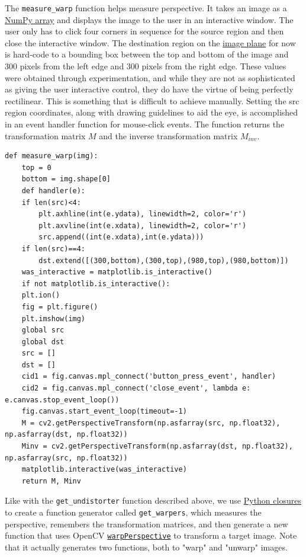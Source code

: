 \documentclass[11pt]{article}
\begin{document}
The \texttt{measure\_warp} function helps measure perspective.  It takes
an image as a \href{https://docs.scipy.org/doc/numpy/reference/generated/numpy.array.html}{NumPy array} and displays the image to the user in
an interactive window.  The user only has to click four corners
in sequence for the source region and then close the interactive
window.  The destination region on the \href{https://en.wikipedia.org/wiki/Image_plane}{image plane} for now is
hard-code to a bounding box between the top and bottom of the
image and 300 pixels from the left edge and 300 pixels from the
right edge.  These values were obtained through experimentation,
and while they are not as sophisticated as giving the user
interactive control, they do have the virtue of being perfectly
rectilinear.  This is something that is difficult to achieve
manually.  Setting the src region coordinates, along with
drawing guidelines to aid the eye, is accomplished in an
event handler function for mouse-click events.  The function
returns the transformation matrix $M$ and the inverse
transformation matrix $M_{inv}$.  

\begin{verbatim}
def measure_warp(img):
    top = 0
    bottom = img.shape[0]
    def handler(e):
	if len(src)<4:
	    plt.axhline(int(e.ydata), linewidth=2, color='r')
	    plt.axvline(int(e.xdata), linewidth=2, color='r')
	    src.append((int(e.xdata),int(e.ydata)))
	if len(src)==4:
	    dst.extend([(300,bottom),(300,top),(980,top),(980,bottom)])
    was_interactive = matplotlib.is_interactive()
    if not matplotlib.is_interactive():
	plt.ion()
    fig = plt.figure()
    plt.imshow(img)
    global src                                                            
    global dst                                                            
    src = []
    dst = []
    cid1 = fig.canvas.mpl_connect('button_press_event', handler)
    cid2 = fig.canvas.mpl_connect('close_event', lambda e: e.canvas.stop_event_loop())
    fig.canvas.start_event_loop(timeout=-1)
    M = cv2.getPerspectiveTransform(np.asfarray(src, np.float32), np.asfarray(dst, np.float32))
    Minv = cv2.getPerspectiveTransform(np.asfarray(dst, np.float32), np.asfarray(src, np.float32))
    matplotlib.interactive(was_interactive)
    return M, Minv
\end{verbatim}

Like with the \texttt{get\_undistorter} function described above, we use
\href{https://www.programiz.com/python-programming/closure}{Python closures} to create a function generator called
\texttt{get\_warpers}, which measures the perspective, remembers the
transformation matrices, and then generate a new function that
uses OpenCV \href{http://docs.opencv.org/2.4/modules/imgproc/doc/geometric_transformations.html#warpperspective}{\texttt{warpPerspective}} to transform a target image.  Note
that it actually generates two functions, both to "warp" and
"unwarp" images.
\end{document}
